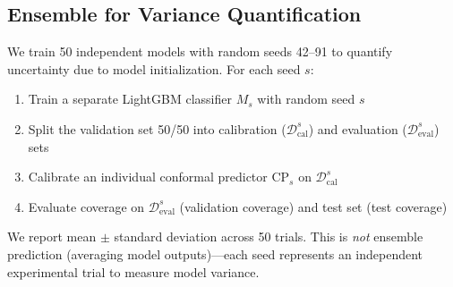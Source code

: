 


\subsection{Ensemble for Variance Quantification}

We train 50 independent models with random seeds 42--91 to quantify uncertainty
due to model initialization. For each seed $s$:

\begin{enumerate}
    \item Train a separate LightGBM classifier $M_s$ with random seed $s$
    \item Split the validation set 50/50 into calibration ($\mathcal{D}_{\text{cal}}^s$)
          and evaluation ($\mathcal{D}_{\text{eval}}^s$) sets
    \item Calibrate an individual conformal predictor $\text{CP}_s$ on $\mathcal{D}_{\text{cal}}^s$
    \item Evaluate coverage on $\mathcal{D}_{\text{eval}}^s$ (validation coverage)
          and test set (test coverage)
\end{enumerate}

We report mean $\pm$ standard deviation across 50 trials. This is \textit{not}
ensemble prediction (averaging model outputs)---each seed represents an
independent experimental trial to measure model variance.



